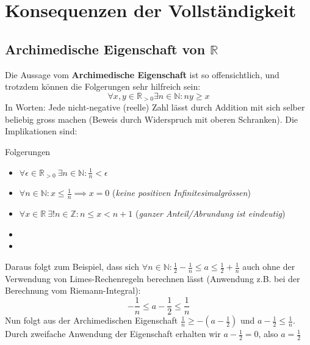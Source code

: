 

\section{Konsequenzen der Vollständigkeit} \label{cha_consequences_completeness}
\subsection{Archimedische Eigenschaft von $\mathbb{R}$}
Die Aussage vom \textbf{Archimedische Eigenschaft} ist so offensichtlich, und trotzdem können die Folgerungen sehr hilfreich sein:
$$\forall x,y \in \mathbb{R}_{>0} \exists n \in \mathbb{N}: ny\geq x$$
In Worten: Jede nicht-negative (reelle) Zahl lässt durch Addition mit sich selber beliebig gross machen (Beweis durch Widerspruch mit oberen Schranken). Die Implikationen sind:

\begin{satz}{Folgerungen}{}
\begin{itemize}
    \item $\forall \epsilon \in \mathbb{R}_{>0} \ \exists n \in \mathbb{N}: \frac{1}{n} < \epsilon$
    \item $\forall n \in \mathbb{N}: x \leq \frac{1}{n} \implies x = 0$ \hspace*{\fill} (\textit{keine positiven Infinitesimalgrössen})
    \item $\forall x \in \mathbb{R} \ \exists! n \in \mathbb{Z}: n \leq x < n+1$\hspace*{\fill} (\textit{ganzer Anteil/Abrundung ist eindeutig})
    \item {}
    \item {}
\end{itemize} 
\end{satz}

Daraus folgt zum Beispiel, dass sich $\forall n \in \mathbb{N}: \frac{1}{2}-\frac{1}{n} \leq a \leq \frac{1}{2}+\frac{1}{n}$ auch ohne der Verwendung von Limes-Rechenregeln berechnen lässt (Anwendung z.B. bei der Berechnung vom Riemann-Integral):
$$-\frac{1}{n} \leq a - \frac{1}{2} \leq \frac{1}{n}$$
Nun folgt aus der Archimedischen Eigenschaft $\frac{1}{n} \geq -(a-\frac{1}{2})$ und $a-\frac{1}{2} \leq \frac{1}{n}$. Durch zweifache Anwendung der Eigenschaft erhalten wir $a - \frac{1}{2} = 0$, also $a = \frac{1}{2}$


